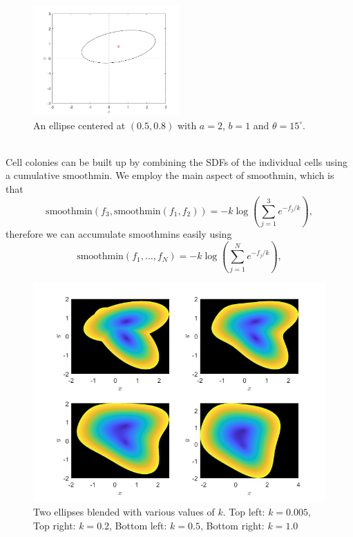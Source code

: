 \begin{figure}[h]
    \centering
    \includegraphics[width=0.5\textwidth]{chapter1/figures/ellipse_translated_rotated.jpg}
    \caption{An ellipse centered at $(0.5, 0.8)$ with $a = 2$, $b=1$ and $\theta = 15^{\circ}$.}
    \label{fig:Ellipse_Centered}
    \end{figure}
\\
Cell colonies can be built up by combining the SDFs of the individual cells 
using a cumulative $\textrm{smoothmin}$. We employ the main aspect of 
$\textrm{smoothmin}$, which is that 
\begin{equation}
    \textrm{smoothmin}(f_3, \textrm{smoothmin}(f_1,f_2)) = -k \log( \sum_{j=1}^3 e^{-f_j/k}),
\end{equation}
therefore we can accumulate smoothmins easily using
\begin{equation}
    \textrm{smoothmin}(f_1, \ldots, f_N) = -k \log( \sum_{j=1}^N e^{-f_j/k}),
\end{equation}
\begin{figure}[h]
\centering
\includegraphics[width=1\textwidth]{chapter1/figures/ellipse_SDFs_blended.jpg}
\caption{Two ellipses blended with various values of $k$. 
Top left: $k= 0.005$, Top right: $k=0.2$, Bottom left: $k = 0.5$, Bottom right: $k=1.0$}
\label{fig:Ellipse_Centered}
\end{figure}


